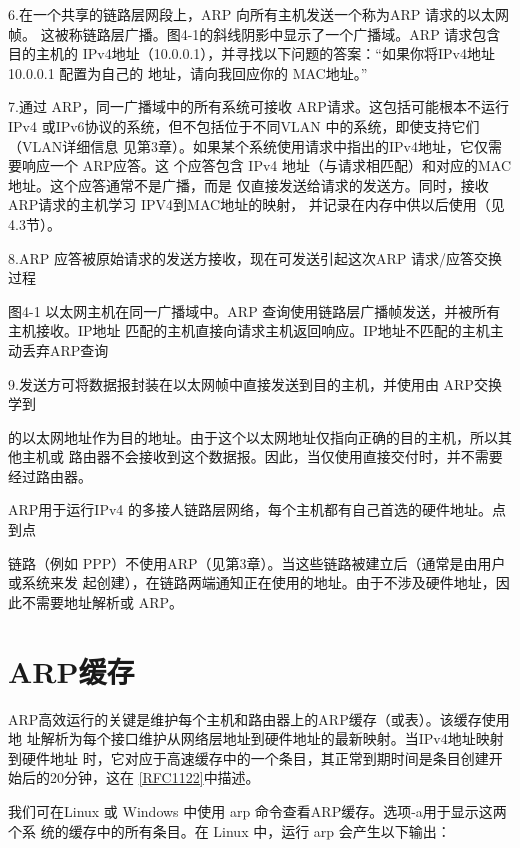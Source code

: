 6.在一个共享的链路层网段上，ARP 向所有主机发送一个称为ARP 请求的以太网帧。
这被称链路层广播。图4-1的斜线阴影中显示了一个广播域。ARP 请求包含目的主机的
IPv4地址（10.0.0.1），并寻找以下问题的答案：“如果你将IPv4地址10.0.0.1 配置为自己的
地址，请向我回应你的 MAC地址。”

7.通过 ARP，同一广播域中的所有系统可接收 ARP请求。这包括可能根本不运行IPv4
或IPv6协议的系统，但不包括位于不同VLAN 中的系统，即使支持它们（VLAN详细信息
见第3章）。如果某个系统使用请求中指出的IPv4地址，它仅需要响应一个 ARP应答。这
个应答包含 IPv4 地址（与请求相匹配）和对应的MAC地址。这个应答通常不是广播，而是
仅直接发送给请求的发送方。同时，接收ARP请求的主机学习 IPV4到MAC地址的映射，
并记录在内存中供以后使用（见4.3节）。

8.ARP 应答被原始请求的发送方接收，现在可发送引起这次ARP 请求/应答交换过程

图4-1 以太网主机在同一广播域中。ARP 查询使用链路层广播帧发送，并被所有主机接收。IP地址
匹配的主机直接向请求主机返回响应。IP地址不匹配的主机主动丢弃ARP查询

9.发送方可将数据报封装在以太网帧中直接发送到目的主机，并使用由 ARP交换学到

的以太网地址作为目的地址。由于这个以太网地址仅指向正确的目的主机，所以其他主机或
路由器不会接收到这个数据报。因此，当仅使用直接交付时，并不需要经过路由器。

ARP用于运行IPv4 的多接人链路层网络，每个主机都有自己首选的硬件地址。点到点

链路（例如 PPP）不使用ARP（见第3章）。当这些链路被建立后（通常是由用户或系统来发
起创建），在链路两端通知正在使用的地址。由于不涉及硬件地址，因此不需要地址解析或
ARP。

\section{ARP缓存}

ARP高效运行的关键是维护每个主机和路由器上的ARP缓存（或表）。该缓存使用地
址解析为每个接口维护从网络层地址到硬件地址的最新映射。当IPv4地址映射到硬件地址
时，它对应于高速缓存中的一个条目，其正常到期时间是条目创建开始后的20分钟，这在
\href{https://www.rfc-editor.org/rfc/rfc1122}{[RFC1122]}中描述。

我们可在Linux 或 Windows 中使用 arp 命令查看ARP缓存。选项-a用于显示这两个系
统的缓存中的所有条目。在 Linux 中，运行 arp 会产生以下输出：

